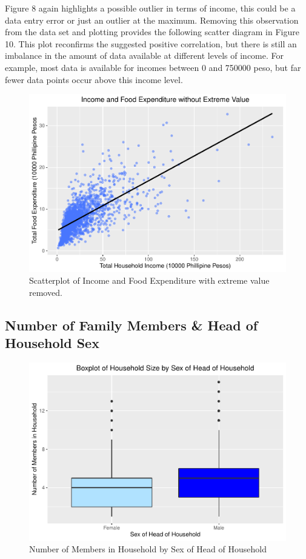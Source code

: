 \documentclass[
]{article}
\begin{document}
Figure 8 again highlights a possible outlier in terms of income, this
could be a data entry error or just an outlier at the maximum. Removing
this observation from the data set and plotting provides the following
scatter diagram in Figure 10. This plot reconfirms the suggested
positive correlation, but there is still an imbalance in the amount of
data available at different levels of income. For example, most data is
available for incomes between 0 and 750000 peso, but far fewer data
points occur above this income level.

\begin{figure}[H]

{\centering \includegraphics[width=0.8\linewidth]{Group_01_files/figure-latex/balance without outlier-1} 

}

\caption{Scatterplot of Income and Food Expenditure with extreme value removed.}\label{fig:balance without outlier}
\end{figure}

\hypertarget{number-of-family-members-head-of-household-sex}{%
\subsection{Number of Family Members \& Head of Household
Sex}\label{number-of-family-members-head-of-household-sex}}

\begin{figure}[H]

{\centering \includegraphics[width=0.8\linewidth]{Group_01_files/figure-latex/boxplot of sex and members-1} 

}

\caption{Number of Members in Household by Sex of Head of Household}\label{fig:boxplot of sex and members}
\end{figure}
\end{document}
